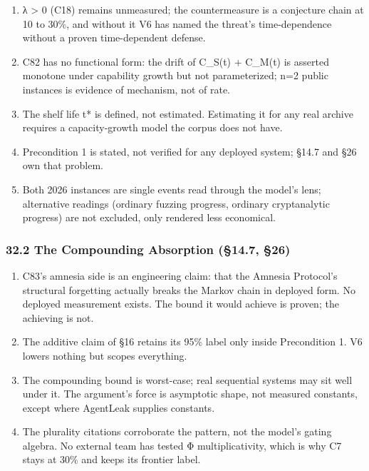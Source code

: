 \documentclass[
]{article}
\providecommand{\tightlist}{%
  \setlength{\itemsep}{0pt}\setlength{\parskip}{0pt}}
\begin{document}
\begin{enumerate}
\def\labelenumi{\arabic{enumi}.}
\tightlist
\item
  λ \textgreater{} 0 (C18) remains unmeasured; the countermeasure is a
  conjecture chain at 10 to 30\%, and without it V6 has named the
  threat's time-dependence without a proven time-dependent defense.
\item
  C82 has no functional form: the drift of C\_S(t) + C\_M(t) is asserted
  monotone under capability growth but not parameterized; n=2 public
  instances is evidence of mechanism, not of rate.
\item
  The shelf life t* is defined, not estimated. Estimating it for any
  real archive requires a capacity-growth model the corpus does not
  have.
\item
  Precondition 1 is stated, not verified for any deployed system; §14.7
  and §26 own that problem.
\item
  Both 2026 instances are single events read through the model's lens;
  alternative readings (ordinary fuzzing progress, ordinary
  cryptanalytic progress) are not excluded, only rendered less
  economical.
\end{enumerate}

\subsubsection{32.2 The Compounding Absorption (§14.7,
§26)}\label{the-compounding-absorption-14.7-26}

\begin{enumerate}
\def\labelenumi{\arabic{enumi}.}
\tightlist
\item
  C83's amnesia side is an engineering claim: that the Amnesia
  Protocol's structural forgetting actually breaks the Markov chain in
  deployed form. No deployed measurement exists. The bound it would
  achieve is proven; the achieving is not.
\item
  The additive claim of §16 retains its 95\% label only inside
  Precondition 1. V6 lowers nothing but scopes everything.
\item
  The compounding bound is worst-case; real sequential systems may sit
  well under it. The argument's force is asymptotic shape, not measured
  constants, except where AgentLeak supplies constants.
\item
  The plurality citations corroborate the pattern, not the model's
  gating algebra. No external team has tested Φ multiplicativity, which
  is why C7 stays at 30\% and keeps its frontier label.
\end{enumerate}
\end{document}
